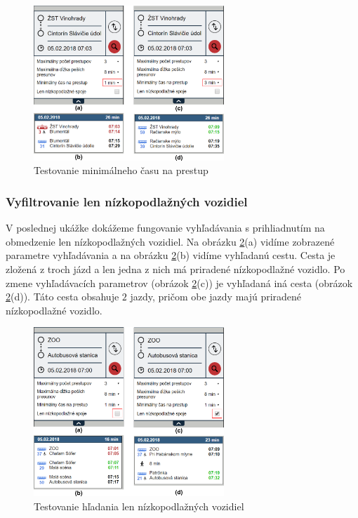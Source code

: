 \begin{figure}[H]
\centerline{\includegraphics[width=0.64\textwidth]{images/test/min-transfer}}
\caption[Testovanie minimálneho času na prestup]{Testovanie minimálneho času na prestup}
\label{fig:test-min-transfer}
\end{figure}


\subsubsection{Vyfiltrovanie len nízkopodlažných vozidiel}
V poslednej ukážke dokážeme fungovanie vyhľadávania s prihliadnutím na obmedzenie len nízkopodlažných vozidiel. Na obrázku \ref{fig:test-low-floor}(a) vidíme zobrazené parametre vyhľadávania a na obrázku \ref{fig:test-low-floor}(b) vidíme vyhľadanú cestu. Cesta je zložená z troch jázd a len jedna z nich má priradené nízkopodlažné vozidlo. Po zmene vyhľadávacích parametrov (obrázok \ref{fig:test-low-floor}(c)) je vyhľadaná iná cesta (obrázok \ref{fig:test-low-floor}(d)). Táto cesta obsahuje $2$ jazdy, pričom obe jazdy majú priradené nízkopodlažné vozidlo.

\begin{figure}[H]
\centerline{\includegraphics[width=0.64\textwidth]{images/test/low-floor}}
\caption[Testovanie hľadania len nízkopodlažných vozidiel]{Testovanie hľadania len nízkopodlažných vozidiel}
\label{fig:test-low-floor}
\end{figure}

